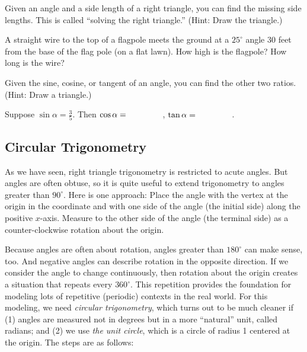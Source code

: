 Given an angle and a side length of a right triangle, you can find the missing side lengths.  This is called ``solving the right triangle.''  (Hint: Draw the triangle.)  

\begin{prob}
A straight wire to the top of a flagpole meets the ground at a $25^\circ$ angle 30 feet from the base of the flag pole (on a flat lawn).  How high is the flagpole?  How long is the wire?  
\end{prob}

Given the sine, cosine, or tangent of an angle, you can find the other two ratios.  (Hint: Draw a triangle.)

\begin{prob}
Suppose $\sin\alpha = \frac{3}{5}$.  Then $\cos\alpha = \hspace{0.6in}$, $\tan\alpha = \hspace{0.6in}$.  
\end{prob}

\subsection{Circular Trigonometry}
As we have seen, right triangle trigonometry is restricted to acute angles.  But angles are often obtuse, so it is quite useful to extend trigonometry to angles greater than $90^\circ$.  Here is one approach:  Place the angle with the vertex at the origin in the coordinate and with one side of the angle (the initial side) along the positive $x$-axis.  Measure to the other side of the angle (the terminal side) as a counter-clockwise rotation about the origin.   

%

Because angles are often about rotation, angles greater than $180^\circ$ can make sense, too.  And negative angles can describe rotation in the opposite direction.  If we consider the angle to change continuously, then rotation about the origin creates a situation that repeats every $360^\circ$.  This repetition provides the foundation for modeling lots of repetitive (periodic) contexts in the real world.  For this modeling, we need \emph{circular trigonometry}, which turns out to be much cleaner if (1) angles are measured not in degrees but in a more ``natural'' unit, called radians; and (2) we use \emph{the unit circle}, which is a circle of radius 1 centered at the origin.   The steps are as follows:  

